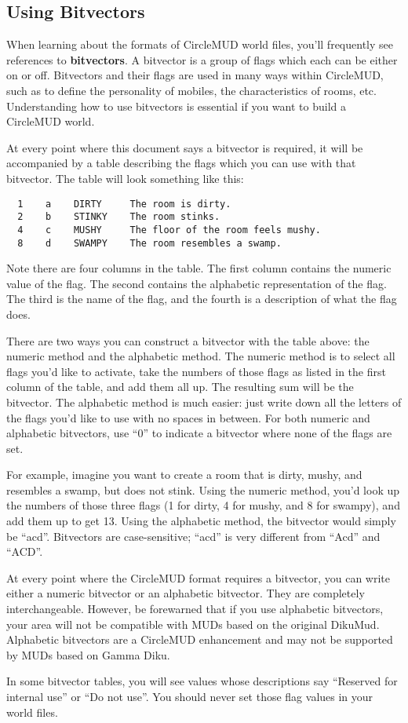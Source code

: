 \documentclass[11pt]{article}
\begin{document}
\subsection{Using Bitvectors}\label{usingbitvectors}
When learning about the formats of CircleMUD world files, you'll frequently see references to {\bf bitvectors}.  A bitvector is a group of flags which each can be either on or off.  Bitvectors and their flags are used in many ways within CircleMUD, such as to define the personality of mobiles, the characteristics of rooms, etc.  Understanding how to use bitvectors is essential if you want to build a CircleMUD world.
\par
At every point where this document says a bitvector is required, it will be accompanied by a table describing the flags which you can use with that bitvector.  The table will look something like this:
\begin{verbatim}
  1    a    DIRTY     The room is dirty.
  2    b    STINKY    The room stinks.
  4    c    MUSHY     The floor of the room feels mushy.
  8    d    SWAMPY    The room resembles a swamp.
\end{verbatim}

Note there are four columns in the table.  The first column contains the numeric value of the flag.  The second contains the alphabetic representation of the flag.  The third is the name of the flag, and the fourth is a description of what the flag does.
\par
There are two ways you can construct a bitvector with the table above: the numeric method and the alphabetic method.  The numeric method is to select all flags you'd like to activate, take the numbers of those flags as listed in the first column of the table, and add them all up.  The resulting sum will be the bitvector.  The alphabetic method is much easier: just write down all the letters of the flags you'd like to use with no spaces in between.  For both numeric and alphabetic bitvectors, use ``0'' to indicate a bitvector where none of the flags are set.
\par
For example, imagine you want to create a room that is dirty, mushy, and resembles a swamp, but does not stink.  Using the numeric method, you'd look up the numbers of those three flags (1 for dirty, 4 for mushy, and 8 for swampy), and add them up to get 13.  Using the alphabetic method, the bitvector would simply be ``acd''.  Bitvectors are case-sensitive; ``acd'' is very different from ``Acd'' and ``ACD''. 
\par
At every point where the CircleMUD format requires a bitvector, you can write either a numeric bitvector or an alphabetic bitvector.  They are completely interchangeable.  However, be forewarned that if you use alphabetic bitvectors, your area will not be compatible with MUDs based on the original DikuMud.  Alphabetic bitvectors are a CircleMUD enhancement and may not be supported by MUDs based on Gamma Diku. 
\par
In some bitvector tables, you will see values whose descriptions say ``Reserved for internal use'' or ``Do not use''.  You should never set those flag values in your world files. 
\end{document}
